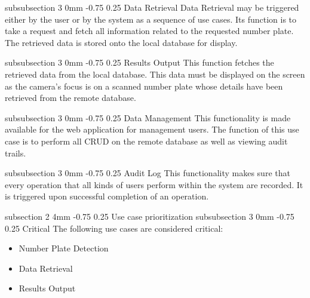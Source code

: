 \documentclass[12pt]{article}
\makeatletter
\renewcommand{\subsection}{\@startsection
   {subsection}%
   {2}%
   {4mm}%
   {-0.75\baselineskip}%
   {0.25\baselineskip}%
   {\rmfamily\normalfont\scshape\normalsize}}%
\renewcommand{\subsubsection}{\@startsection
   {subsubsection}%
   {3}%
   {0mm}%
   {-0.75\baselineskip}%
   {0.25\baselineskip}%
   {\rmfamily\normalfont\slshape\normalsize}}%
\makeatother
\begin{document}
                    		\subsubsection{Data Retrieval}
                    				Data Retrieval may be triggered either by the user or by the system as a sequence of use cases. Its function is to take a request and fetch all information related to the requested number plate. The retrieved data is stored onto the local database for display.
                    		
                    		\subsubsection{Results Output}
                    				This function fetches the retrieved data from the local database. This data must be displayed on the screen as the camera's focus is on a scanned number plate whose details have been retrieved from the remote database. 
                    				
                    				
                    		\subsubsection{Data Management}
                    				This functionality is made available for the web application for management users. The function of this use case is to perform all CRUD on the remote database as well as viewing audit trails.
                    				
                    		\subsubsection{Audit Log}
                    				This functionality makes sure that every operation that all kinds of users perform within the system are recorded. It is triggered upon successful completion of an operation.
                    				
                    \subsection{Use case prioritization}
                    		\subsubsection{Critical}
                    				The following use cases are considered critical:
                    				\begin{itemize}
	                    					\item Number Plate Detection
	                    					\item Data Retrieval
	                    					\item Results Output
                    				\end{itemize}
                    				
\end{document}
